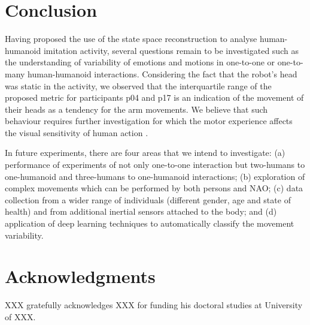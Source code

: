 \documentclass{sigchi}
\begin{document}
\section{Conclusion}


Having proposed the use of the state space reconstruction to analyse human-humanoid
imitation activity, several questions remain to be investigated such as the
understanding of variability of emotions and motions in one-to-one or
one-to-many human-humanoid interactions.
Considering the fact that the robot's head was static in the activity,
we observed that the interquartile range of the proposed metric for participants p04 and p17
is an indication of the movement of their heads as a tendency for the arm movements.
We believe that such behaviour requires further investigation for which the motor
experience affects the visual sensitivity of human action \cite{blake2007}.

In future experiments, there are four areas that we intend to investigate:
(a) performance of experiments of not only one-to-one interaction but
two-humans to one-humanoid and three-humans to one-humanoid interactions;
(b) exploration of complex movements which can be performed by both persons and NAO;
(c) data collection from a wider range of individuals
(different gender, age and state of health) and from additional inertial sensors
attached to the body; and
(d) application of deep learning techniques to automatically classify the
movement variability.



\section{Acknowledgments}

XXX gratefully acknowledges XXX for funding his doctoral studies at
University of XXX.

%
%
%
%
%


\balance{}



\end{document}
